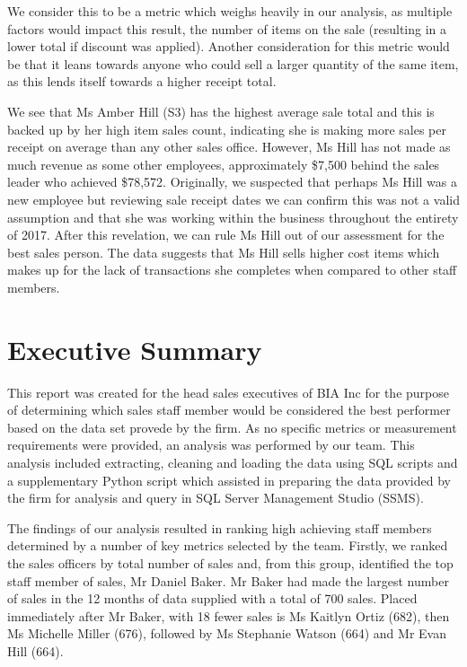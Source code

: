 \documentclass{article}
\begin{document}
            We consider this to be a metric which weighs heavily in our analysis,
            as multiple factors would impact this result, the number of items on the sale
            (resulting in a lower total if discount was applied). Another consideration 
            for this metric would be that it leans towards anyone who could
            sell a larger quantity of the same item, as this lends itself towards a higher
            receipt total. 
			
			\par
			We see that Ms Amber Hill (S3) has the highest average sale total and this is backed up by
			her high item sales count, indicating she is making more sales per receipt on average than
			any other sales office. 
			However, Ms Hill has not made as much revenue as some other employees, approximately \$7,500
			behind the sales leader who achieved \$78,572. Originally, we suspected that perhaps Ms Hill
			was a new employee but reviewing sale receipt dates we can confirm this was not a valid
			assumption and that she was working within the business throughout the entirety of 2017.
			After this revelation, we can rule Ms Hill out of our assessment for the best sales person.
			The data suggests that Ms Hill sells higher cost items which makes up for the lack of
			transactions she completes when compared to other staff members. 

    \newpage
    
    
    
    \section{Executive Summary}
    \label{sec:Executive Summary}
	This report was created for the head sales executives of BIA Inc for the purpose of
	determining which sales staff member would be considered the best performer based on
	the data set provede by the firm. As no specific metrics or measurement requirements
	were provided, an analysis was performed by our team. This analysis included extracting,
	cleaning and loading the data using SQL scripts and a supplementary Python script which
	assisted in preparing the data provided by the firm for analysis and query in SQL Server
	Management Studio (SSMS). 
    \vspace{5mm}
    \par\noindent
    
    \noindent The findings of our analysis resulted in ranking high achieving staff members
    determined by a number of key metrics selected by the team. Firstly, we ranked the sales
    officers by total number of sales and, from this group, identified the top staff member
    of sales, Mr Daniel Baker. Mr Baker had made the largest number of sales in the 12 months
    of data supplied with a total of 700 sales. Placed immediately after Mr Baker, with 18 fewer
    sales is Ms Kaitlyn Ortiz (682), then Ms Michelle Miller (676), followed by Ms Stephanie
    Watson (664) and Mr Evan Hill (664).
    \vspace{5mm}
    \par\noindent
    
\end{document}
